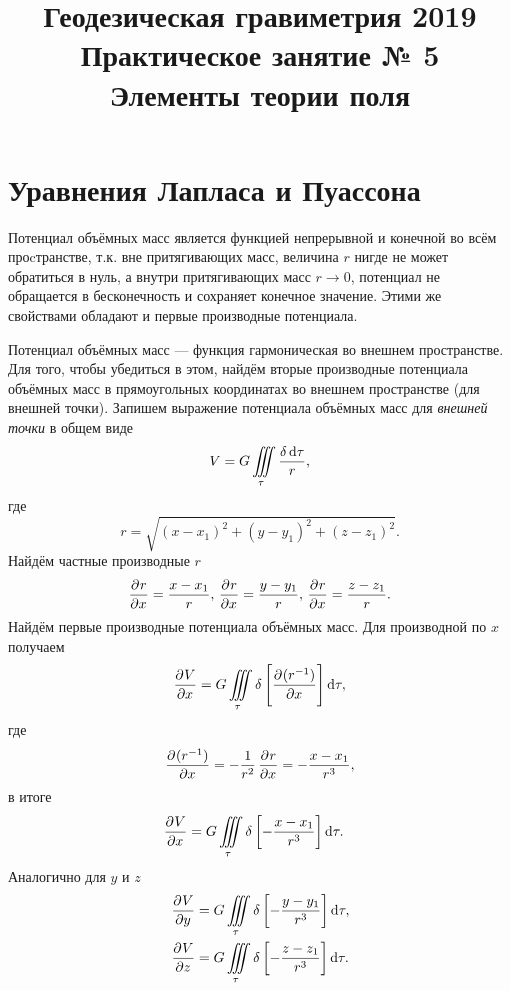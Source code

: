 \documentclass[11pt, a4paper]{article}
\title{{\Large Геодезическая гравиметрия 2019}\\ 
    {\bf\Large Практическое занятие № 5} \\
{\Large Элементы теории поля}}
\author{}
\date{\DTMusedate{lessondate}}
\theoremstyle{plain}
\theoremstyle{definition}
\theoremstyle{remark}
\begin{document}
\maketitle

\section{Уравнения Лапласа и Пуассона}
Потенциал объёмных масс является функцией непрерывной и конечной во всём проcтранстве, т.к. вне притягивающих масс, величина $r$ нигде не может обратиться в нуль, а внутри притягивающих масс $r \to 0$, потенциал не обращается в бесконечность и сохраняет конечное значение. Этими же свойствами обладают и первые производные потенциала.

Потенциал объёмных масс --- функция гармоническая во внешнем пространстве. Для того, чтобы убедиться в этом, найдём вторые производные потенциала объёмных масс в прямоугольных координатах во внешнем пространстве (для внешней точки). Запишем выражение потенциала объёмных масс для \textit{внешней точки} в общем виде
\begin{equation*}
	V = G\iiint\limits_{\tau} \dfrac{\delta \dif \tau}{r},
\end{equation*}
где 
\begin{equation*}
	r = \sqrt{(x-x_1)^2 + (y-y_1)^2 + (z-z_1)^2}.
\end{equation*}
Найдём частные производные $r$
\begin{equation*}
	\dpd{r}{x} = \dfrac{x-x_1}{r}, \\
	\dpd{r}{x} = \dfrac{y-y_1}{r}, \\
	\dpd{r}{x} = \dfrac{z-z_1}{r}. 
\end{equation*}
Найдём первые производные потенциала объёмных масс. Для производной по $x$ получаем
\begin{equation*}
	\dpd{V}{x} = G\iiint\limits_{\tau} \delta \left[\dpd{(r^{-1})}{x}\right] \dif \tau,
\end{equation*}
где
\begin{equation*}
	\dpd{(r^{-1})}{x} = - \dfrac{1}{r^2} \dpd{r}{x} = - \dfrac{x-x_1}{r^3},
\end{equation*}
в итоге
\begin{align*}	
	&\dpd{V}{x} = G\iiint\limits_{\tau} \delta \left[ - \dfrac{x-x_1}{r^3} \right] \dif \tau.
\end{align*}
Аналогично для $y$ и $z$
\begin{align*}	
	&\dpd{V}{y} = G\iiint\limits_{\tau} \delta \left[ - \dfrac{y-y_1}{r^3} \right] \dif \tau, \\
	&\dpd{V}{z} = G\iiint\limits_{\tau} \delta \left[ - \dfrac{z-z_1}{r^3} \right] \dif \tau.
\end{align*}
\end{document}
